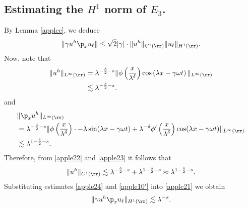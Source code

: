 \subsection{Estimating the $H^1$ norm of $\hyperref[all_errors_together]{E_3}$.} 
By Lemma \ref{applec}, we deduce
\begin{equation}
	\begin{split}
		\|\gamma u^h \p_x u_\ell \| \le \sqrt{2} |\gamma| \cdot \|u^h\|_{C^1(\rr)}
		\|u_\ell\|_{H^1(\rr)}.
		\label{apple21}
	\end{split}
\end{equation}
Now, note that
\begin{equation}
	\begin{split}
		\|u^h\|_{L^\infty(\rr)} 
		& = \lambda^{-\frac{\delta}{2} -s } \|\phi\left( \frac{x}{\lambda^\delta}
		\right) \cos \left( \lambda x - \gamma \omega t \right) \|_{L^\infty(\rr)}
		\\
		& \lesssim \lambda^{-\frac{\delta}{2} -s }.
		\label{apple22}
	\end{split}
\end{equation}
and 
\begin{equation}
	\begin{split}
		& \|\p_x u^h \|_{L^\infty(\rr)}
		\\
		& = \lambda^{-\frac{\delta}{2}-s} \|\phi\left(
		\frac{x}{\lambda^\delta}
		\right) \cdot -\lambda \sin(\lambda x - \gamma \omega t) + \lambda^{-\delta}
		\phi'\left( \frac{x}{\lambda^\delta}\right) \cos(\lambda x - \gamma \omega
		t) \|_{L^\infty(\rr)}
		\\
		& \lesssim \lambda^{1 - \frac{\delta}{2} -s }.
		\label{apple23}
	\end{split}
\end{equation}
Therefore, from \eqref{apple22} and \eqref{apple23} it follows that
\begin{equation}
	\begin{split}
		\|u^h\|_{C^1(\rr)} \lesssim \lambda^{-\frac{\delta}{2} -s } + \lambda^{1
		-\frac{\delta}{2} -s}
		\approx \lambda^{1- \frac{\delta}{2} -s}.
		\label{apple24}
	\end{split}
\end{equation}
Substituting estimates \eqref{apple24} and  \eqref{apple10'} into \eqref{apple21} we obtain
\begin{equation}
	\begin{split}
		\|\gamma u^h \p_x u_\ell \|_{H^1(\rr)} \lesssim \lambda^{-s}.
		\label{apple24'}
	\end{split}
\end{equation}
